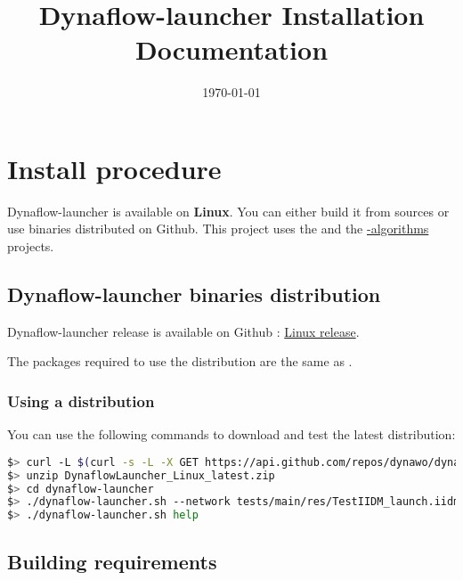\documentclass[a4paper, 12pt]{report}
\begin{document}
\title{Dynaflow-launcher Installation Documentation}
\date\today

\maketitle
\tableofcontents

\chapter{Install procedure}

Dynaflow-launcher is available on \textbf{Linux}.
You can either build it from sources or use binaries distributed on Github.
This project uses the \href{https://github.com/dynawo/dynawo}{\Dynawo}  and the \href{https://github.com/dynawo/dynawo-algorithms}{\Dynawo-algorithms} projects.

\section{Dynaflow-launcher binaries distribution}

Dynaflow-launcher release is available on Github : \href{https://github.com/dynawo/dynaflow-launcher/releases/download/v1.4.0/DynaFlowLauncher_Linux_v1.4.0.zip}{Linux release}.

The packages required to use the distribution are the same as \Dynawo.

\subsection{Using a distribution}

You can use the following commands to download and test the latest distribution:
\begin{lstlisting}[language=bash, breaklines=true, breakatwhitespace=false, columns=fullflexible]
$> curl -L $(curl -s -L -X GET https://api.github.com/repos/dynawo/dynaflow-launcher/releases/latest | grep "DynaFlowLauncher_Linux" | grep url | cut -d '"' -f 4) -o DynaflowLauncher_Linux_latest.zip
$> unzip DynaflowLauncher_Linux_latest.zip
$> cd dynaflow-launcher
$> ./dynaflow-launcher.sh --network tests/main/res/TestIIDM_launch.iidm --config tests/main/res/config_launch.json
$> ./dynaflow-launcher.sh help
\end{lstlisting}

\section{Building requirements}
\end{document}
